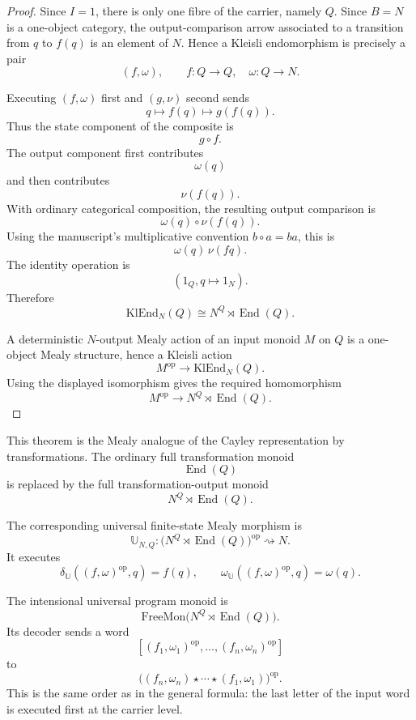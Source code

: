 \begin{proof}
Since \(I=1\), there is only one fibre of the carrier, namely \(Q\).  Since \(B=N\) is a
one-object category, the output-comparison arrow associated to a transition from \(q\) to \(f(q)\)
is an element of \(N\).  Hence a Kleisli endomorphism is precisely a pair
\[
        (f,\omega),
        \qquad
        f:Q\to Q,
        \quad
        \omega:Q\to N.
\]

Executing \((f,\omega)\) first and \((g,\nu)\) second sends
\[
        q
        \longmapsto
        f(q)
        \longmapsto
        g(f(q)).
\]
Thus the state component of the composite is
\[
        g\circ f.
\]
The output component first contributes
\[
        \omega(q)
\]
and then contributes
\[
        \nu(f(q)).
\]
With ordinary categorical composition, the resulting output comparison is
\[
        \omega(q)\circ\nu(f(q)).
\]
Using the manuscript's multiplicative convention \(b\circ a=ba\), this is
\[
        \omega(q)\,\nu(fq).
\]
The identity operation is
\[
        (1_Q,q\mapsto 1_N).
\]
Therefore
\[
        \mathrm{KlEnd}_N(Q)
        \cong
        N^Q\rtimes\operatorname{End}(Q).
\]

A deterministic \(N\)-output Mealy action of an input monoid \(M\) on \(Q\) is a one-object Mealy
structure, hence a Kleisli action
\[
        M^{\operatorname{op}}\to\mathrm{KlEnd}_N(Q).
\]
Using the displayed isomorphism gives the required homomorphism
\[
        M^{\operatorname{op}}\to N^Q\rtimes\operatorname{End}(Q).
\]
\end{proof}

This theorem is the Mealy analogue of the Cayley representation by transformations.  The ordinary
full transformation monoid
\[
        \operatorname{End}(Q)
\]
is replaced by the full transformation-output monoid
\[
        N^Q\rtimes\operatorname{End}(Q).
\]

The corresponding universal finite-state Mealy morphism is
\[
        \mathbb U_{N,Q}:
        \bigl(N^Q\rtimes \operatorname{End}(Q)\bigr)^{\operatorname{op}}
        \rightsquigarrow N.
\]
It executes
\[
        \delta_{\mathbb U}((f,\omega)^{\operatorname{op}},q)=f(q),
        \qquad
        \omega_{\mathbb U}((f,\omega)^{\operatorname{op}},q)=\omega(q).
\]

The intensional universal program monoid is
\[
        \mathrm{FreeMon}\bigl(N^Q\rtimes\operatorname{End}(Q)\bigr).
\]
Its decoder sends a word
\[
        [(f_1,\omega_1)^{\operatorname{op}},\ldots,(f_n,\omega_n)^{\operatorname{op}}]
\]
to
\[
        \bigl(
        (f_n,\omega_n)\star\cdots\star(f_1,\omega_1)
        \bigr)^{\operatorname{op}}.
\]
This is the same order as in the general formula: the last letter of the input word is executed
first at the carrier level.

